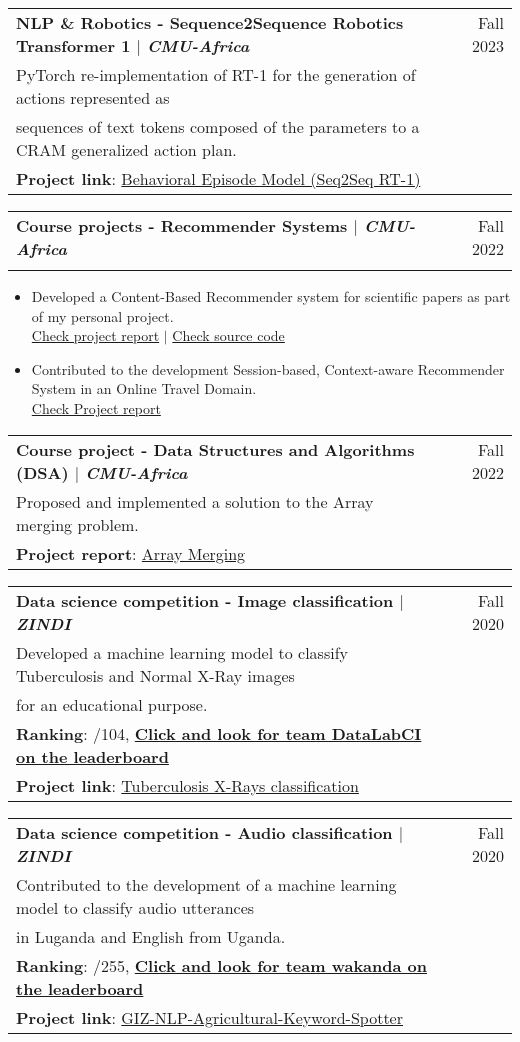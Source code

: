 \documentclass[A4,11pt]{article}
\makeatletter
\newcommand{\CVItem}[1]{
  \item\small{
    {#1 \vspace{-2pt}}
  }
}
\newcommand{\CVSubheading}[4]{
  \vspace{-2pt}\item
    \begin{tabular*}{0.97\textwidth}[t]{l@{\extracolsep{\fill}}r}
      \textbf{#1} & #2 \\
      \small#3 & \small #4 \\
    \end{tabular*}\vspace{-7pt}
}
\newcommand{\CVItemListStart}{\begin{itemize}}
\newcommand{\CVItemListEnd}{\end{itemize}\vspace{-5pt}}
\makeatother
\begin{document}
\CVSubheading
{{NLP \& Robotics - Sequence2Sequence Robotics Transformer 1} $|$ \emph{\small{CMU-Africa}}}{Fall 2023}
{PyTorch re-implementation of RT-1 for the generation of actions represented as \\
sequences of text tokens composed of the parameters to a CRAM generalized action plan.\\
  \textbf{Project link}: \href{https://github.com/dric2018/smf_be}{Behavioral Episode Model (Seq2Seq RT-1)}
}{}

\CVSubheading
{{Course projects - Recommender Systems} $|$ \emph{\small{CMU-Africa}}}{Fall 2022}
{}{}
\CVItemListStart
\CVItem{Developed a Content-Based Recommender system for scientific papers as part of my personal project.\\
\href{https://drive.google.com/file/d/1uGFDoeo8A1XUb8rJloArxej1mTn1gIpW/view?usp=drive_link}{Check project report} $|$ \href{https://github.com/dric2018/ScietificPaperCBRS}{Check source code}
}
\CVItem{Contributed to the development Session-based, Context-aware Recommender System in an Online Travel Domain.\\
  \href{https://drive.google.com/file/d/14eQnujFpAeI2UUcF1mfISOEqsW1OuqCi/view?usp=drive_link}{Check Project report}
}
\CVItemListEnd

\CVSubheading
{{Course project - Data Structures and Algorithms (DSA)} $|$ \emph{\small{CMU-Africa}}}{Fall 2022}
{Proposed and implemented a solution to the Array merging problem.\\
  \textbf{Project report}: \href{https://drive.google.com/file/d/1zgVpXr20PhzYbI6qBsgSx-KKEhkL9Oso/view?usp=drive_link}{Array Merging}
}{}

\CVSubheading
{{Data science competition - Image classification} $|$ \emph{\small{ZINDI}}}{Fall 2020}
{Developed a machine learning model to classify Tuberculosis and Normal X-Ray images \\
  for an educational purpose. \\
  \textbf{Ranking}: \nth{7}/104, \textbf{\href{https://zindi.africa/competitions/runmila-ai-institute-minohealth-ai-labs-tuberculosis-classification-via-x-rays-challenge/leaderboard}{Click and look for team DataLabCI on the leaderboard}} \\
  \textbf{Project link}: \href{https://github.com/dric2018/ZindiTuberculosisClassification}{Tuberculosis X-Rays classification}
}{}

\CVSubheading
{{Data science competition - Audio classification} $|$ \emph{\small{ZINDI}}}{Fall 2020}
{Contributed to the development of a machine learning model to classify audio utterances \\
  in Luganda and English from Uganda. \\
  \textbf{Ranking}: \nth{7}/255, \textbf{\href{https://zindi.africa/competitions/giz-nlp-agricultural-keyword-spotter/leaderboard}{Click and look for team wakanda on the leaderboard}} \\
  \textbf{Project link}: \href{https://github.com/NazarioR9/GIZ-NLP-Agricultural-Keyword-Spotter}{GIZ-NLP-Agricultural-Keyword-Spotter}
}{}
\end{document}
